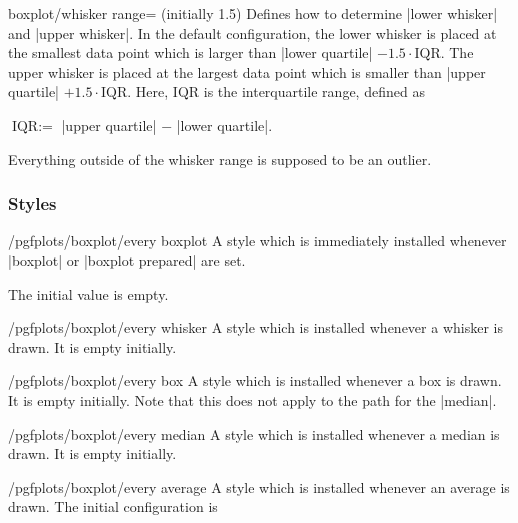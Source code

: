 \begin{pgfplotskey}{boxplot/whisker range= (initially 1.5)}
    Defines how to determine |lower whisker| and |upper whisker|. In the
    default configuration, the lower whisker is placed at the smallest data
    point which is larger than |lower quartile| $- 1.5 \cdot \text{IQR}$. The
    upper whisker is placed at the largest data point which is smaller than
    |upper quartile| $+ 1.5 \cdot \text{IQR}$. Here, $\text{IQR}$ is the
    interquartile range, defined as

    $\text{IQR} := $ |upper quartile| $-$ |lower quartile|.

    Everything outside of the whisker range is supposed to be an outlier.
\end{pgfplotskey}
\endgroup


\subsubsection{Styles}

\begin{stylekey}{/pgfplots/boxplot/every boxplot}
    A style which is immediately installed whenever |boxplot| or
    |boxplot prepared| are set.

    The initial value is empty.
\end{stylekey}

\begin{stylekey}{/pgfplots/boxplot/every whisker}
    A style which is installed whenever a whisker is drawn. It is empty
    initially.
\end{stylekey}

\begin{stylekey}{/pgfplots/boxplot/every box}
    A style which is installed whenever a box is drawn. It is empty initially.
    Note that this does not apply to the path for the |median|.
\end{stylekey}

\begin{stylekey}{/pgfplots/boxplot/every median}
    A style which is installed whenever a median is drawn. It is empty
    initially.
\end{stylekey}

\begin{stylekey}{/pgfplots/boxplot/every average}
    A style which is installed whenever an average is drawn. The initial
    configuration is
\begin{codeexample}
\end{codeexample}
\end{stylekey}



